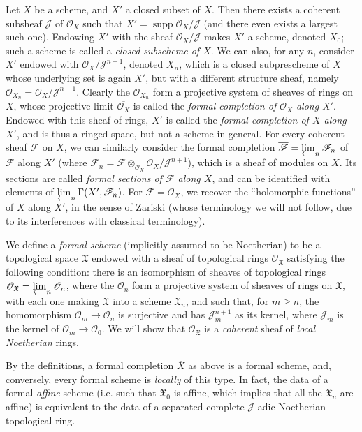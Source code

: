 \documentclass{article}
\theoremstyle{plain}
\theoremstyle{definition}
\newcommand{\sh}{\mathscr}
\newcommand{\fk}{\mathfrak}
\renewcommand{\geq}{\geqslant}
\DeclareMathOperator{\supp}{supp}
\newcommand{\oldpage}[1]{\marginpar{\footnotesize$\Big\vert$ \textit{p.~#1}}}
\begin{document}
Let $X$ be a scheme, and $X'$ a closed subset of $X$.
Then there exists a coherent subsheaf $\sh{J}$ of $\sh{O}_X$ such that $X'=\supp\sh{O}_X/\sh{J}$ (and there even exists a largest such one).
Endowing $X'$ with the sheaf $\sh{O}_X/\sh{J}$ makes $X'$ a scheme, denoted $X_0$;
such a scheme is called a \emph{closed subscheme of $X$}.
We can also, for any $n$, consider $X'$ endowed with $\sh{O}_X/\sh{J}^{n+1}$, denoted $X_n$, which is a closed subprescheme of $X$ whose underlying set is again $X'$, but with a different structure sheaf, namely $\sh{O}_{X_n}=\sh{O}_X/\sh{J}^{n+1}$.
Clearly the $\sh{O}_{X_n}$ form a projective system of sheaves of rings on $X$, whose projective limit $\overline{\sh{O}_X}$ is called the \emph{formal completion of $\sh{O}_X$ along $X'$}.
Endowed with this sheaf of rings, $X'$ is called the \emph{formal completion of $X$ along $X'$}, and is thus a ringed space, but not a scheme in general.
For every coherent sheaf $\sh{F}$ on $X$, we can similarly consider the formal completion $\overline{\sh{F}}=\varprojlim_n\sh{F}_n$ of $\sh{F}$ along $X'$ (where $\sh{F}_n=\sh{F}\otimes_{\sh{O}_X}\sh{O}_X/\sh{J}^{n+1}$), which is a sheaf of modules on $\overline{X}$.
Its sections are called \emph{formal sections of $\sh{F}$ along $X$}, and can be identified with elements of $\varprojlim_n\Gamma(X',\sh{F}_n)$.
For $\sh{F}=\sh{O}_X$, we recover the ``holomorphic functions'' of $X$ along $X'$, in the sense of Zariski (whose terminology we will not follow, due to its interferences with classical terminology).

We define a \emph{formal scheme} (implicitly assumed to be Noetherian) to be a topological space $\fk{X}$ endowed with a sheaf of topological rings $\sh{O}_{\fk{X}}$ satisfying the following condition:
there is an isomorphism of sheaves of topological rings $\sh{O}_{\fk{X}}=\varprojlim_n\sh{O}_n$, where the $\sh{O}_n$ form a projective system of sheaves of rings on $\fk{X}$, with each one making $\fk{X}$ into a scheme $\fk{X}_n$, and such that, for $m\geq n$, the homomorphism $\sh{O}_m\to\sh{O}_n$ is surjective and has $\sh{J}_m^{n+1}$ as its kernel, where $\sh{J}_m$ is
\oldpage{182-04}
the kernel of $\sh{O}_m\to\sh{O}_0$.
We will show that $\sh{O}_{\fk{X}}$ is a \emph{coherent} sheaf of \emph{local Noetherian} rings.

By the definitions, a formal completion $\overline{X}$ as above is a formal scheme, and, conversely, every formal scheme is \emph{locally} of this type.
In fact, the data of a formal \emph{affine} scheme (i.e. such that $\fk{X}_0$ is affine, which implies that all the $\fk{X}_n$ are affine) is equivalent to the data of a separated complete $\sh{J}$-adic Noetherian topological ring.
\end{document}
